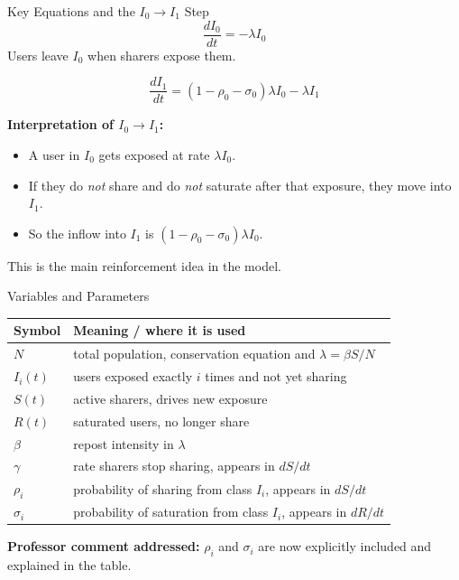 \documentclass[aspectratio=169]{beamer}
\begin{document}
\begin{frame}{Key Equations and the $I_0 \to I_1$ Step}
  \[
  \frac{dI_0}{dt}=-\lambda I_0
  \]
  Users leave $I_0$ when sharers expose them.

  \vspace{0.4em}
  \[
  \frac{dI_1}{dt}=(1-\rho_0-\sigma_0)\lambda I_0-\lambda I_1
  \]

  \textbf{Interpretation of $I_0 \to I_1$:}
  \begin{itemize}
    \item A user in $I_0$ gets exposed at rate $\lambda I_0$.
    \item If they do \emph{not} share and do \emph{not} saturate after that exposure, they move into $I_1$.
    \item So the inflow into $I_1$ is $(1-\rho_0-\sigma_0)\lambda I_0$.
  \end{itemize}

  \vspace{0.4em}
  This is the main reinforcement idea in the model.
\end{frame}

\begin{frame}{Variables and Parameters}
  \small
  \begin{tabular}{ll}
    \toprule
    Symbol & Meaning / where it is used \\
    \midrule
    $N$ & total population, conservation equation and $\lambda=\beta S/N$ \\
    $I_i(t)$ & users exposed exactly $i$ times and not yet sharing \\
    $S(t)$ & active sharers, drives new exposure \\
    $R(t)$ & saturated users, no longer share \\
    $\beta$ & repost intensity in $\lambda$ \\
    $\gamma$ & rate sharers stop sharing, appears in $dS/dt$ \\
    $\rho_i$ & probability of sharing from class $I_i$, appears in $dS/dt$ \\
    $\sigma_i$ & probability of saturation from class $I_i$, appears in $dR/dt$ \\
    \bottomrule
  \end{tabular}

  \vspace{0.5em}
  \normalsize
  \textbf{Professor comment addressed:} $\rho_i$ and $\sigma_i$ are now explicitly included and explained in the table.
\end{frame}
\end{document}

